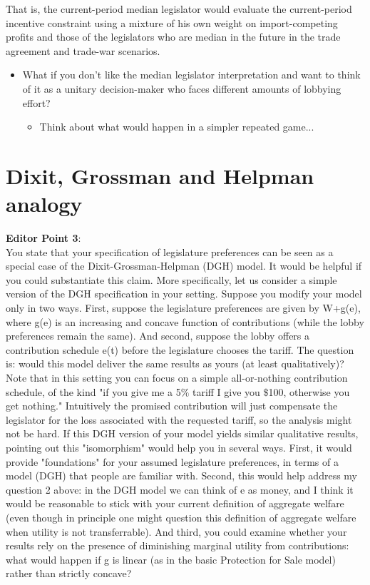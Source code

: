 \documentclass[12pt]{article}
\begin{document}
That is, the current-period median legislator would evaluate the current-period incentive constraint using a mixture of his own weight on import-competing profits and those of the legislators who are median in the future in the trade agreement and trade-war scenarios.
\begin{itemize}
	\item What if you don't like the median legislator interpretation and want to think of it as a unitary decision-maker who faces different amounts of lobbying effort?
		\begin{itemize}
			\item Think about what would happen in a simpler repeated game...
		\end{itemize}
\end{itemize}

\newpage
\section{Dixit, Grossman and Helpman analogy}
\textbf{Editor Point 3}: \\
You state that your specification of legislature preferences can be seen as a special case of the Dixit-Grossman-Helpman (DGH) model. It would be helpful if you could substantiate this claim. More specifically, let us consider a simple version of the DGH specification in your setting. Suppose you modify your model only in two ways. First, suppose the legislature preferences are given by W+g(e), where g(e) is an increasing and concave function of contributions (while the lobby preferences remain the same). And second, suppose the lobby offers a contribution schedule e(t) before the legislature chooses the tariff. The question is: would this model deliver the same results as yours (at least qualitatively)? Note that in this setting you can focus on a simple all-or-nothing contribution schedule, of the kind "if you give me a 5$\%$ tariff I give you $\$$100, otherwise you get nothing." Intuitively the promised contribution will just compensate the legislator for the loss associated with the requested tariff, so the analysis might not be hard.  If this DGH version of your model yields similar qualitative results, pointing out this "isomorphism" would help you in several ways. First, it would provide "foundations" for your assumed legislature preferences, in terms of a model (DGH) that people are familiar with. Second, this would help address my question 2 above: in the DGH model we can think of e as money, and I think it would be reasonable to stick with your current definition of aggregate welfare (even though in principle one might question this definition of aggregate welfare when utility is not transferrable). And third, you could examine whether your results rely on the presence of diminishing marginal utility from contributions: what would happen if g is linear (as in the basic Protection for Sale model) rather than strictly concave? \\
\end{document}
